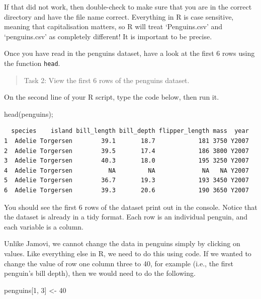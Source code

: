 \documentclass[
]{scrbook}
\newenvironment{Shaded}{\begin{snugshade}}{\end{snugshade}}
\newcommand{\DecValTok}[1]{\textcolor[rgb]{0.00,0.00,0.81}{#1}}
\newcommand{\FunctionTok}[1]{\textcolor[rgb]{0.00,0.00,0.00}{#1}}
\newcommand{\NormalTok}[1]{#1}
\newcommand{\OtherTok}[1]{\textcolor[rgb]{0.56,0.35,0.01}{#1}}
\begin{document}
If that did not work, then double-check to make sure that you are in the correct directory and have the file name correct.
Everything in R is case sensitive, meaning that capitalisation matters, so R will treat `Penguins.csv' and `penguins.csv' as completely different!
It is important to be precise.

Once you have read in the penguins dataset, have a look at the first 6 rows using the function \texttt{head}.

\begin{quote}
Task 2: View the first 6 rows of the penguins dataset.
\end{quote}

On the second line of your R script, type the code below, then run it.

\begin{Shaded}
\begin{Highlighting}[]
\FunctionTok{head}\NormalTok{(penguins);}
\end{Highlighting}
\end{Shaded}

\begin{verbatim}
  species    island bill_length bill_depth flipper_length mass  year
1  Adelie Torgersen        39.1       18.7            181 3750 Y2007
2  Adelie Torgersen        39.5       17.4            186 3800 Y2007
3  Adelie Torgersen        40.3       18.0            195 3250 Y2007
4  Adelie Torgersen          NA         NA             NA   NA Y2007
5  Adelie Torgersen        36.7       19.3            193 3450 Y2007
6  Adelie Torgersen        39.3       20.6            190 3650 Y2007
\end{verbatim}

You should see the first 6 rows of the dataset print out in the console.
Notice that the dataset is already in a tidy format.
Each row is an individual penguin, and each variable is a column.

Unlike Jamovi, we cannot change the data in penguins simply by clicking on values.
Like everything else in R, we need to do this using code.
If we wanted to change the value of row one column three to 40, for example (i.e., the first penguin's bill depth), then we would need to do the following.

\begin{Shaded}
\begin{Highlighting}[]
\NormalTok{penguins[}\DecValTok{1}\NormalTok{, }\DecValTok{3}\NormalTok{] }\OtherTok{\textless{}{-}} \DecValTok{40}
\end{Highlighting}
\end{Shaded}
\end{document}
